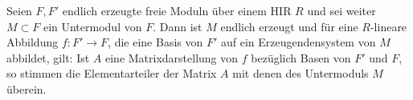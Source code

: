 \begin{thKorollar}
    Seien $F,F'$ endlich erzeugte freie Moduln über einem HIR $R$ und sei weiter
    $M\subset F$ ein Untermodul von $F$. Dann ist $M$ endlich erzeugt und für
    eine $R$-lineare Abbildung $f\colon F'\to F$, die eine Basis von $F'$ auf
    ein Erzeugendensystem von $M$ abbildet, gilt: Ist $A$ eine Matrixdarstellung
    von $f$ bezüglich Basen von $F'$ und $F$, so stimmen die Elementarteiler der
    Matrix $A$ mit denen des Untermoduls $M$ überein.
\end{thKorollar}








